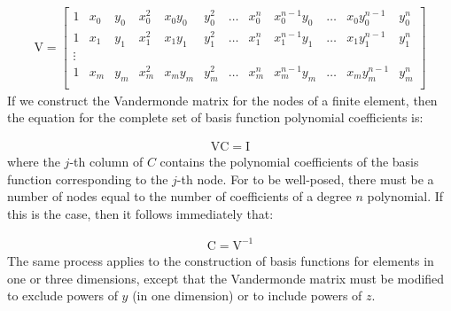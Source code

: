 \documentclass{book}
\begin{document}
\label{\detokenize{2_finite_elements:equation-Vandermonde}}\begin{equation}\label{equation:2_finite_elements:Vandermonde}
\begin{split}\mathrm{V} =
\begin{bmatrix}
1 & x_0 & y_0 & x_0^2 & x_0y_0 & y_0^2 & \ldots & x_0^n & x_0^{n-1}y_0 & \ldots & x_0y_0^{n-1} & y_0^n \\
1 & x_1 & y_1 & x_1^2 & x_1y_1 & y_1^2 & \ldots & x_1^n & x_1^{n-1}y_1 & \ldots & x_1y_1^{n-1} & y_1^n \\
\vdots \\
1 & x_m & y_m & x_m^2 & x_my_m & y_m^2 & \ldots & x_m^n & x_m^{n-1}y_m & \ldots & x_my_m^{n-1} & y_m^n \\
\end{bmatrix}\end{split}
\end{equation}
If we construct the Vandermonde matrix for the nodes of a finite
element, then the equation for the complete set of basis function
polynomial coefficients is:

\label{\detokenize{2_finite_elements:equation-vdm-equation}}\begin{equation}\label{equation:2_finite_elements:vdm-equation}
\begin{split}\mathrm{V}\mathrm{C} = \mathrm{I}\end{split}
\end{equation}
where the \(j\)-th column of \(C\) contains the polynomial coefficients of
the basis function corresponding to the \(j\)-th node. For
{\hyperref[\detokenize{2_finite_elements:equation-vdm-equation}]{}} to be well-posed, there must be a number of nodes
equal to the number of coefficients of a degree \(n\) polynomial. If
this is the case, then it follows immediately that:

\label{\detokenize{2_finite_elements:equation-2_finite_elements:3}}\begin{equation}\label{equation:2_finite_elements:2_finite_elements:3}
\begin{split}\mathrm{C} = \mathrm{V}^{-1}\end{split}
\end{equation}
The same process applies to the construction of basis functions for
elements in one or three dimensions, except that the Vandermonde
matrix must be modified to exclude powers of \(y\) (in one dimension) or
to include powers of \(z\).
\end{document}
